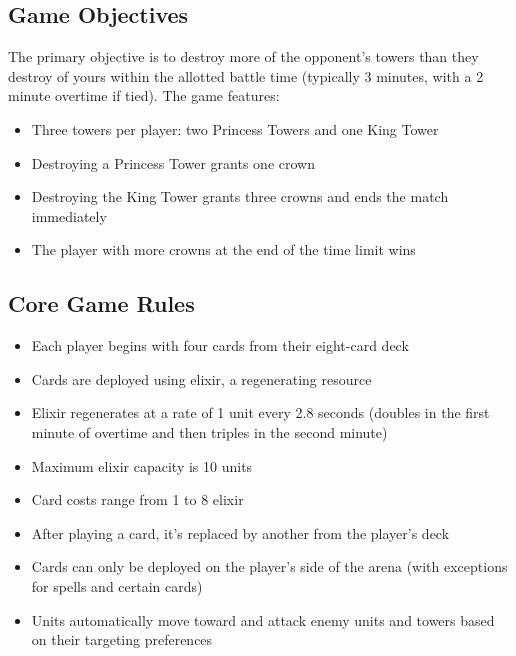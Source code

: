 \documentclass{article}
\begin{document}
\subsection{Game Objectives}
The primary objective is to destroy more of the opponent's towers than they destroy of yours within the allotted battle time (typically 3 minutes, with a 2 minute overtime if tied). The game features:
\begin{itemize}
    \item Three towers per player: two Princess Towers and one King Tower
    \item Destroying a Princess Tower grants one crown
    \item Destroying the King Tower grants three crowns and ends the match immediately
    \item The player with more crowns at the end of the time limit wins
\end{itemize}

\subsection{Core Game Rules}
\begin{itemize}
    \item Each player begins with four cards from their eight-card deck
    \item Cards are deployed using elixir, a regenerating resource
    \item Elixir regenerates at a rate of 1 unit every 2.8 seconds (doubles in the first minute of overtime and then triples in the second minute)
    \item Maximum elixir capacity is 10 units
    \item Card costs range from 1 to 8 elixir
    \item After playing a card, it's replaced by another from the player's deck
    \item Cards can only be deployed on the player's side of the arena (with exceptions for spells and certain cards)
    \item Units automatically move toward and attack enemy units and towers based on their targeting preferences
\end{itemize}
\end{document}
